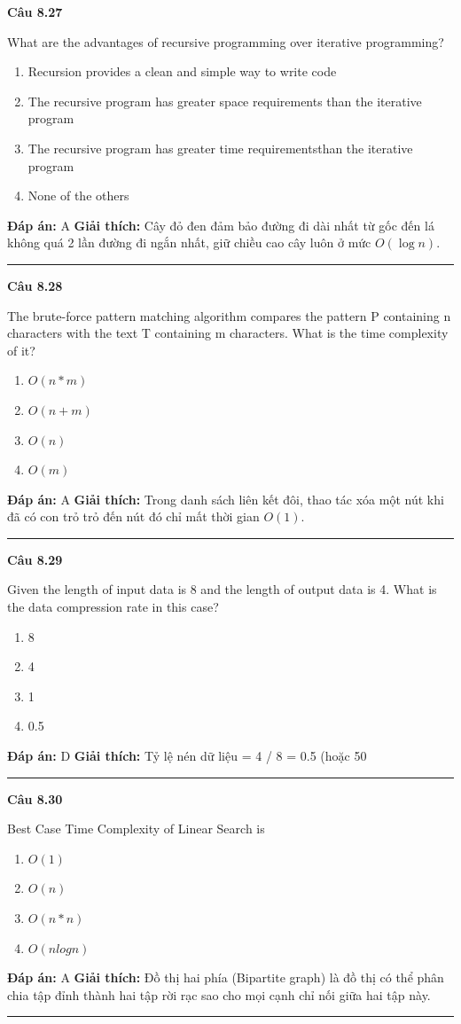 \documentclass[11pt,a4paper]{article}
\newenvironment{question}[1]{%
  \par\vspace{1em}\noindent\textbf{\large Câu #1}\par\vspace{0.4em}
}{%
  \par\vspace{1em}\hrule\vspace{0.6em}
}
\newenvironment{choices}{%
  \begin{enumerate}[label=\textbf{\Alph*.},leftmargin=2.2em,itemsep=2pt,topsep=3pt]
}{%
  \end{enumerate}
}
\newcommand{\choice}{\item}
\begin{document}
\begin{question}{8.27}
What are the advantages of recursive programming over iterative programming?
\begin{choices}
\choice Recursion provides a clean and simple way to write code
\choice The recursive program has greater space requirements than the iterative program
\choice The recursive program has greater time requirementsthan the iterative program
\choice None of the others
\end{choices}
\textbf{Đáp án:} A
\textbf{Giải thích:} Cây đỏ đen đảm bảo đường đi dài nhất từ gốc đến lá không quá 2 lần đường đi ngắn nhất, giữ chiều cao cây luôn ở mức \(O(\log n)\).
\end{question}

\begin{question}{8.28}
The brute-force pattern matching algorithm compares the pattern P containing n characters with the text T containing m characters. What is the time complexity of it?
\begin{choices}
\choice \(O(n * m)\)
\choice \(O(n + m)\)
\choice \(O(n)\)
\choice \(O(m)\)
\end{choices}
\textbf{Đáp án:} A
\textbf{Giải thích:} Trong danh sách liên kết đôi, thao tác xóa một nút khi đã có con trỏ trỏ đến nút đó chỉ mất thời gian \(O(1)\).
\end{question}

\begin{question}{8.29}
Given the length of input data is 8 and the length of output data is 4. What is the data compression rate in this case?
\begin{choices}
\choice 8
\choice 4
\choice 1
\choice 0.5
\end{choices}
\textbf{Đáp án:} D
\textbf{Giải thích:} Tỷ lệ nén dữ liệu = 4 / 8 = 0.5 (hoặc 50%
\end{question}

\begin{question}{8.30}
Best Case Time Complexity of Linear Search is
\begin{choices}
\choice \(O(1)\)
\choice \(O(n)\)
\choice \(O(n * n)\)
\choice \(O(nlogn)\)
\end{choices}
\textbf{Đáp án:} A
\textbf{Giải thích:} Đồ thị hai phía (Bipartite graph) là đồ thị có thể phân chia tập đỉnh thành hai tập rời rạc sao cho mọi cạnh chỉ nối giữa hai tập này.
\end{question}
\end{document}
